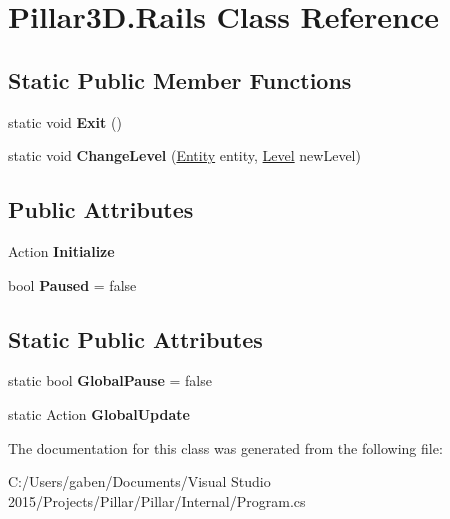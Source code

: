 \hypertarget{class_pillar3_d_1_1_rails}{}\section{Pillar3\+D.\+Rails Class Reference}
\label{class_pillar3_d_1_1_rails}
\subsection*{Static Public Member Functions}
\begin{DoxyCompactItemize}
\item 
\mbox{\label{class_pillar3_d_1_1_rails_aa918313a95451095b7290da48f7a02c6}} 
static void {\bfseries Exit} ()
\item 
\mbox{\label{class_pillar3_d_1_1_rails_ad9bc7982aa9ddfeed3f87ef86c7e732e}} 
static void {\bfseries Change\+Level} (\hyperlink{class_pillar3_d_1_1_entity}{Entity} entity, \hyperlink{class_pillar3_d_1_1_level}{Level} new\+Level)
\end{DoxyCompactItemize}
\subsection*{Public Attributes}
\begin{DoxyCompactItemize}
\item 
\mbox{\label{class_pillar3_d_1_1_rails_a1e2db16fc0eb4a1cc759ea54fb4f36f3}} 
Action {\bfseries Initialize}
\item 
\mbox{\label{class_pillar3_d_1_1_rails_a111399e1129e557f099c5bd3e09b7df2}} 
bool {\bfseries Paused} = false
\end{DoxyCompactItemize}
\subsection*{Static Public Attributes}
\begin{DoxyCompactItemize}
\item 
\mbox{\label{class_pillar3_d_1_1_rails_a531b02c1daf778ca5a0ad2fbe11001c5}} 
static bool {\bfseries Global\+Pause} = false
\item 
\mbox{\label{class_pillar3_d_1_1_rails_aff2abff15d3bb346dae537755ad57688}} 
static Action {\bfseries Global\+Update}
\end{DoxyCompactItemize}


The documentation for this class was generated from the following file\+:\begin{DoxyCompactItemize}
\item 
C\+:/\+Users/gaben/\+Documents/\+Visual Studio 2015/\+Projects/\+Pillar/\+Pillar/\+Internal/Program.\+cs\end{DoxyCompactItemize}
